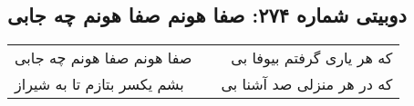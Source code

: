\begin{center}
\section*{دوبیتی شماره ۲۷۴: صفا هونم صفا هونم چه جابی}
\label{sec:274}
\begin{longtable}{l p{0.5cm} r}
صفا هونم صفا هونم چه جابی
&&
که هر یاری گرفتم بیوفا بی
\\
بشم یکسر بتازم تا به شیراز
&&
که در هر منزلی صد آشنا بی
\\
\end{longtable}
\end{center}
